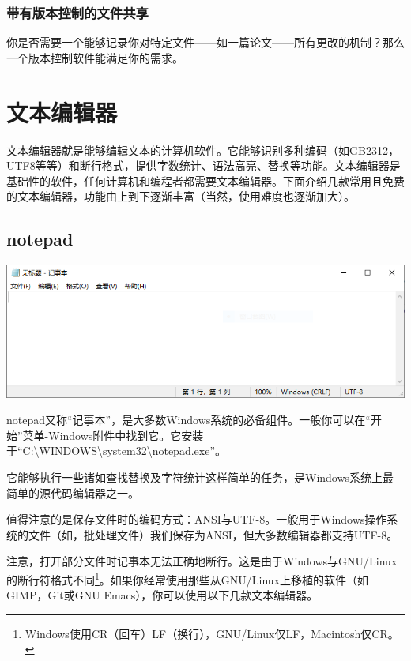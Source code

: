 \subsubsection{带有版本控制的文件共享}
你是否需要一个能够记录你对特定文件——如一篇论文——所有更改的机制？那么一个版本控制软件能满足你的需求。
\section{文本编辑器}
文本编辑器就是能够编辑文本的计算机软件。它能够识别多种编码（如GB2312，UTF8等等）和断行格式，提供字数统计、语法高亮、替换等功能。文本编辑器是基础性的软件，任何计算机和编程者都需要文本编辑器。下面介绍几款常用且免费的文本编辑器，功能由上到下逐渐丰富（当然，使用难度也逐渐加大）。
\subsection{notepad}
\begin{center}
\includegraphics[scale=0.8]{pic/winnotepad.PNG}	
\end{center} \par
notepad又称“记事本”，是大多数Windows系统的必备组件。一般你可以在“开始”菜单-Windows附件中找到它。它安装于“C:\textbackslash WINDOWS\textbackslash system32\textbackslash notepad.exe”。\par
它能够执行一些诸如查找替换及字符统计这样简单的任务，是Windows系统上最简单的源代码编辑器之一。\par
值得注意的是保存文件时的编码方式：ANSI与UTF-8。一般用于Windows操作系统的文件（如，批处理文件）我们保存为ANSI，但大多数编辑器都支持UTF-8。\par
注意，打开部分文件时记事本无法正确地断行。这是由于Windows与GNU/Linux的断行符格式不同\footnote{Windows使用CR（回车）LF（换行），GNU/Linux仅LF，Macintosh仅CR。}。如果你经常使用那些从GNU/Linux上移植的软件（如GIMP，Git或GNU Emacs），你可以使用以下几款文本编辑器。
